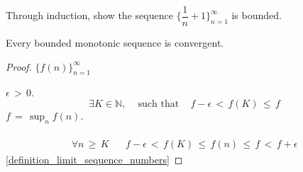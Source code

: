 \begin{exercise}
Through induction, show the sequence $\Big\{\dfrac{1}{n} + 1\Big\}_{n=1}^{\infty}$ is bounded.
\end{exercise}

\begin{theorem}
Every bounded monotonic sequence is convergent.
\label{monotone_bounded_convergent}
\begin{proof}
     $\{f(n)\}_{n = 1}^{\infty}$  \\
     \\
     $\epsilon \hspace{2pt} > \hspace{2pt} 0.$  
    \begin{align*}
        \exists K \in \mathbb{N}, \hspace{10pt} \text{ such that } \hspace{10pt} f - \epsilon \hspace{2pt} < \hspace{2pt} f(K) \hspace{2pt} \leq \hspace{2pt} f
    \end{align*}
     $f \hspace{2pt} = \hspace{2pt} \sup_{n} f(n).$\\ 
     \\
    \begin{align*}
        \forall n \hspace{2pt} \geq \hspace{2pt} K \hspace{20pt} f - \epsilon \hspace{2pt} < \hspace{2pt} f(K) \hspace{2pt} \leq \hspace{2pt} f(n) \hspace{2pt} \leq \hspace{2pt} f \hspace{2pt} < \hspace{2pt} f + \epsilon
    \end{align*}
     \ref{definition_limit_sequence_numbers} 

\end{proof}
\end{theorem}
